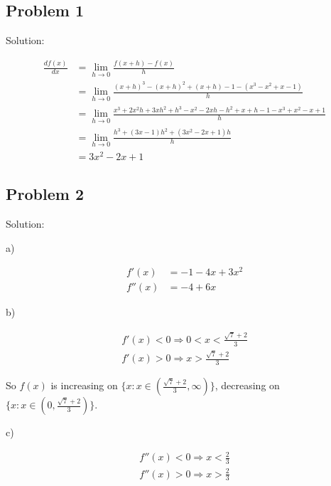 \documentclass[letterpaper, 11pt]{article}
\newcommand{\1}{\mathds{1}}	%
\theoremstyle{definition}
\begin{document}
\subsection*{Problem 1}

Solution:

\begin{align*}
  \frac{d f(x)}{dx} & = \lim_{h \to 0} \frac{f(x+h)-f(x)}{h}                                                                                         \\
                    & =\lim_{h \to 0} \frac{(x+h)^{3}-(x+h)^{2}+(x+h)-1 - (x ^{3} - x ^{2} + x -1)}{h}                                               \\
                    & = \lim_{h \to 0} \frac{x ^{3} + 2 x ^{2}h + 3xh ^{2} + h ^{3} - x ^{2} - 2xh - h ^{2} + x + h - 1 - x ^{3} + x ^{2} - x +1}{h} \\
                    & = \lim_{h \to 0} \frac{h ^{3} + (3x-1)h ^{2}+(3x ^{2} - 2x + 1)h}{h}                                                           \\
                    & = 3x ^{2} - 2x + 1
\end{align*}

\subsection*{Problem 2}

Solution:

a)

\begin{align*}
  f'(x)  & = -1 - 4x + 3x ^{2} \\
  f''(x) & = -4 + 6x
\end{align*}

b)

\begin{align*}
  f'(x) < 0 \Longrightarrow 0 < x < \frac{\sqrt{7}+2}{3} \\
  f'(x) > 0 \Longrightarrow x > \frac{\sqrt{7}+2}{3}
\end{align*}

So $f(x)$ is increasing on $\{x: x \in (\frac{\sqrt{7}+2}{3}, \infty )\}$, decreasing on $\{x: x \in (0, \frac{\sqrt{7}+2}{3})\}$.

c)

\begin{align*}
  f''(x) < 0 \Longrightarrow x < \frac{2}{3} \\
  f''(x) > 0 \Longrightarrow x > \frac{2}{3}
\end{align*}
\end{document}
